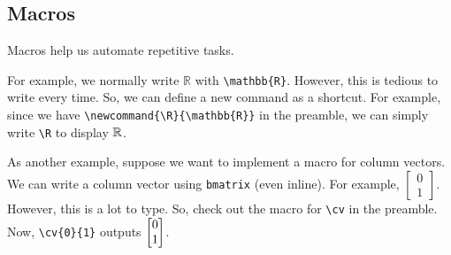 \documentclass{article}
\begin{document}
\subsection{Macros}

Macros help us automate repetitive tasks.

For example, we normally write $\mathbb{R}$ with \texttt{\textbackslash mathbb\{R\}}. However, this is tedious to write every time. So, we can define a new command as a shortcut. For example, since we have \texttt{\textbackslash newcommand\{\textbackslash R\}\{\textbackslash mathbb\{R\}\}} in the preamble, we can simply write \texttt{\textbackslash R} to display $\mathbb{R}$.

As another example, suppose we want to implement a macro for column vectors. We can write a column vector using \texttt{bmatrix} (even inline). For example, $\begin{bmatrix}0\\1\end{bmatrix}$. However, this is a lot to type. So, check out the macro for \texttt{\textbackslash cv} in the preamble. Now, \texttt{\textbackslash cv\{0\}\{1\}} outputs $\begin{bmatrix}0\\1\end{bmatrix}$.

\newpage
\printbibliography
\end{document}
